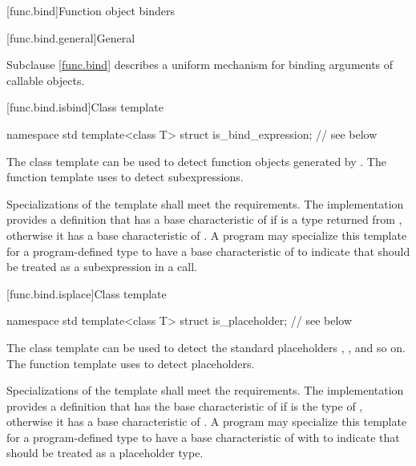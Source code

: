 [func.bind]{Function object binders}%

[func.bind.general]{General}%

\pnum
Subclause \ref{func.bind} describes a uniform mechanism for binding
arguments of callable objects.

[func.bind.isbind]{Class template }

%
\begin{codeblock}
namespace std {
  template<class T> struct is_bind_expression;  // see below
}
\end{codeblock}

\pnum
The class template  can be used to detect function objects
generated by . The function template 
uses  to detect subexpressions.

\pnum
Specializations of the  template shall meet
the  requirements. The implementation
provides a definition that has a base characteristic of
 if  is a type returned from ,
otherwise it has a base characteristic of .
A program may specialize this template for a program-defined type 
to have a base characteristic of  to indicate that
 should be treated as a subexpression in a  call.

[func.bind.isplace]{Class template }

%
\begin{codeblock}
namespace std {
  template<class T> struct is_placeholder;      // see below
}
\end{codeblock}

\pnum
{}%
%
%
%
%
%
%
%
%
%
%
The class template  can be used to detect the standard placeholders
, , and so on.
The function template  uses
 to detect placeholders.

\pnum
Specializations of the  template shall meet
the  requirements. The implementation
provides a definition that has the base characteristic of
 if  is the type of
, otherwise it has a
base characteristic of . A program
may specialize this template for a program-defined type  to
have a base characteristic of 
with  to indicate that  should be
treated as a placeholder type.

